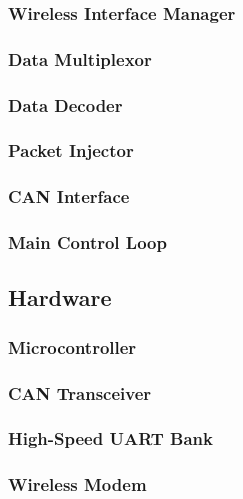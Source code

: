 \subsubsection{Wireless Interface Manager }


\subsubsection{Data Multiplexor}


\subsubsection{Data Decoder }


\subsubsection{Packet Injector}


\subsubsection{CAN Interface}


\subsubsection{Main Control Loop}


\subsection{Hardware}


\subsubsection{Microcontroller}


\subsubsection{CAN Transceiver}


\subsubsection{High-Speed UART Bank}


\subsubsection{Wireless Modem}